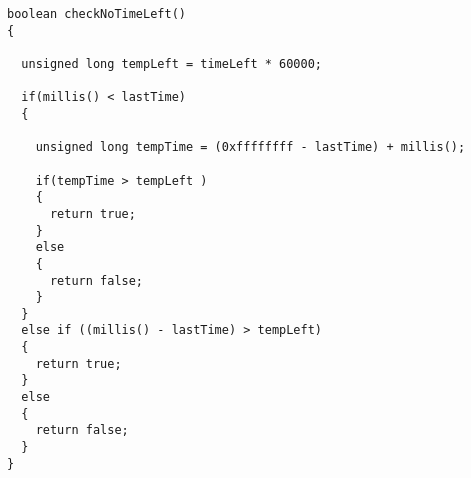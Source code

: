 \begin{lstlisting}[frame=single, label=CNTL, caption=Checking if the user has spendt all his allotted time.]
boolean checkNoTimeLeft()
{
  
  unsigned long tempLeft = timeLeft * 60000;
  
  if(millis() < lastTime)
  {
    
    unsigned long tempTime = (0xffffffff - lastTime) + millis();
    
    if(tempTime > tempLeft )
    {      
      return true;
    }
    else
    {
      return false;
    }
  }
  else if ((millis() - lastTime) > tempLeft)
  {
    return true;
  }
  else
  {
    return false;  
  }  
}
\end{lstlisting}